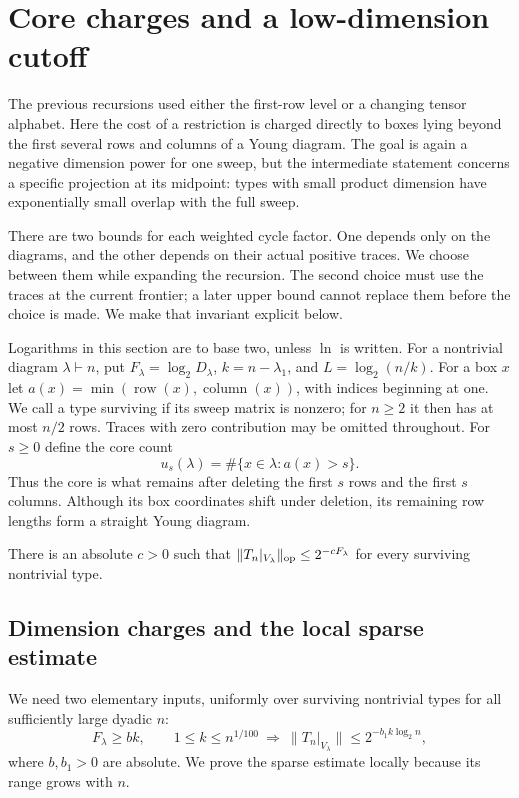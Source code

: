 \section{Core charges and a low-dimension cutoff}
\label{rec:sec-cutoff}

The previous recursions used either the first-row level or a changing
tensor alphabet.  Here the cost of a restriction is charged directly to
boxes lying beyond the first several rows and columns of a Young diagram.
The goal is again a negative dimension power for one sweep, but the
intermediate statement concerns a specific projection at its midpoint:
types with small product dimension have exponentially small overlap with
the full sweep.

There are two bounds for each weighted cycle factor.  One depends only on
the diagrams, and the other depends on their actual positive traces.
We choose between them while expanding the recursion.  The second choice
must use the traces at the current frontier; a later upper bound cannot
replace them before the choice is made.  We make that invariant explicit
below.

Logarithms in this section are to base two, unless $\ln$ is written.
For a nontrivial diagram $\lambda\vdash n$, put
$F_\lambda=\log_2D_\lambda$, $k=n-\lambda_1$, and
$L=\log_2(n/k)$.  For a box $x$ let
$a(x)=\min(\operatorname{row}(x),\operatorname{column}(x))$, with
indices beginning at one.  We call a type surviving if its sweep matrix
is nonzero; for $n\ge2$ it then has at most $n/2$ rows.  Traces with zero contribution
may be omitted throughout.  For $s\ge0$ define the core count
\[
 u_s(\lambda)=\#\{x\in\lambda:a(x)>s\}.
\]
Thus the core is what remains after deleting the first $s$ rows and the
first $s$ columns.  Although its box coordinates shift under deletion,
its remaining row lengths form a straight Young diagram.

\begin{theorem}\label{rec:core-power-main}
There is an absolute $c>0$ such that
$\|T_n|_{V_\lambda}\|_{\mathrm{op}}\le2^{-cF_\lambda}$ for every
surviving nontrivial type.
\end{theorem}

\subsection{Dimension charges and the local sparse estimate}
We need two elementary inputs, uniformly over surviving nontrivial types
for all sufficiently large dyadic $n$:
\begin{equation}\label{rec:core-dimension-sparse}
 F_\lambda\ge b k,\qquad
 1\le k\le n^{1/100}\ \Longrightarrow\
 \|T_n|_{V_\lambda}\|\le2^{-b_1k\log_2n},
\end{equation}
where $b,b_1>0$ are absolute.  We prove the sparse estimate locally
because its range grows with $n$.

